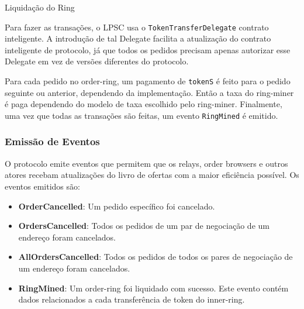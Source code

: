 \documentclass[UTF8,nofonts]{article}
\makeatletter
\newenvironment{figurehere}
 {\def\@captype{figure}}
 {}
\makeatother
\begin{document}
\begin{multicols}{2}
\begin{center}
\begin{figurehere}
\centering
{}
\caption{Liquidação do Ring}
\label{fig:settlement}
\end{figurehere}
\end{center}

Para fazer as transações, o LPSC usa o \verb|TokenTransferDelegate| contrato inteligente. A introdução de tal Delegate facilita a atualização do contrato inteligente de protocolo, já que todos os pedidos precisam apenas autorizar esse Delegate em vez de versões diferentes do protocolo.

Para cada pedido no order-ring, um pagamento de \verb|tokenS| é feito para o pedido seguinte ou anterior, dependendo da implementação. Então a taxa do ring-miner é paga dependendo do modelo de taxa escolhido pelo ring-miner. Finalmente, uma vez que todas as transações são feitas, um evento \verb|RingMined| é emitido.

\subsubsection{Emissão de Eventos\label{sec:events}}

O protocolo emite eventos que permitem que os relays, order browsers e outros atores recebam atualizações do livro de ofertas com a maior eficiência possível. Os eventos emitidos são:

\begin{itemize}
	\item \textbf{OrderCancelled}: Um pedido específico foi cancelado.
	\item \textbf{OrdersCancelled}: Todos os pedidos de um par de negociação de um endereço foram cancelados.
	\item \textbf{AllOrdersCancelled}: Todos os pedidos de todos os pares de negociação de um endereço foram cancelados.
	\item \textbf{RingMined}: Um order-ring  foi liquidado com sucesso. Este evento contém dados relacionados a cada transferência de token do inner-ring.
\end{itemize}



\end{multicols}
\end{document}
